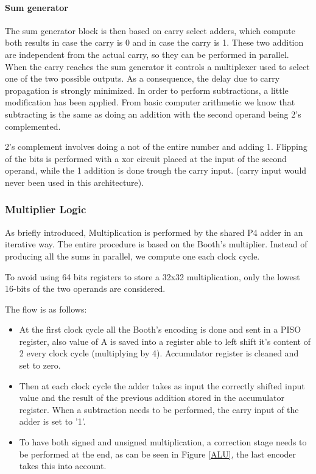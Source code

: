 \documentclass[12pt]{article}
\begin{document}
\paragraph{Sum generator}The sum generator block is then based on carry select adders, which compute both results in case the carry is 0 and in case the carry is 1. These two addition are independent from the actual carry, so they can be performed in parallel. When the carry reaches the sum generator it controls a multiplexer used to select one of the two possible outputs.
As a consequence, the delay due to carry propagation is strongly minimized.
\newline
\newline
In order to perform subtractions, a little modification has been applied. From basic computer arithmetic we know that subtracting is the same as doing an addition with the second operand being 2's complemented.

2's complement involves doing a not of the entire number and adding 1.
Flipping of the bits is performed with a xor circuit placed at the input of the second operand, while the 1 addition is done trough the carry input. (carry input would never been used in this architecture). 



\subsubsection{Multiplier Logic}
As briefly introduced, Multiplication is performed by the shared P4 adder in an iterative way.
The entire procedure is based on the Booth's multiplier. Instead of producing all the sums in parallel, we compute one each clock cycle.

To avoid using 64 bits registers to store a 32x32 multiplication, only the lowest 16-bits of the two operands are considered.

The flow is as follows:
\begin{itemize}
	\item At the first clock cycle all the Booth's encoding is done and sent in a PISO register, also value of A is saved into a register able to left shift it's content of 2 every clock cycle (multiplying by 4). Accumulator register is cleaned and set to zero.
	\item Then at each clock cycle the adder takes as input the correctly shifted input value and the result of the previous addition stored in the accumulator register. When a subtraction needs to be performed, the carry input of the adder is set to '1'.
	\item To have both signed and unsigned multiplication, a correction stage needs to be performed at the end, as can be seen in Figure \ref{ALU}, the last encoder takes this into account.
	
\end{itemize}
\end{document}

